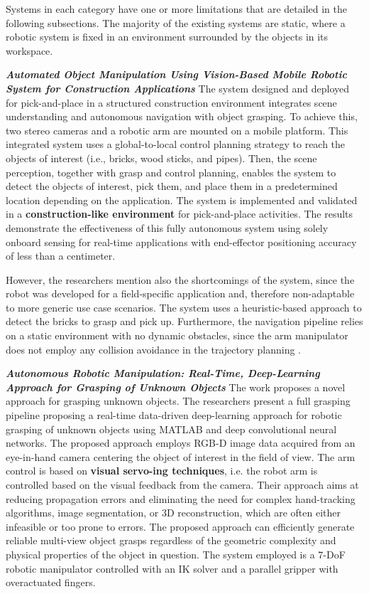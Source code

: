 Systems in each category have one or more limitations that are detailed in the following
subsections. The majority of the existing systems are static, where a robotic system
is fixed in an environment surrounded by the objects in its workspace.

\textbf{\textit{Automated Object Manipulation Using Vision-Based Mobile
		Robotic System for Construction Applications}} \quad
The system designed and deployed for pick-and-place in a structured construction environment
\cite{asadi2019construction} integrates scene understanding and autonomous navigation
with object grasping. To achieve this, two stereo cameras and a robotic arm are mounted
on a mobile platform. This integrated system uses a global-to-local control planning strategy
to reach the objects of interest (i.e., bricks, wood sticks, and pipes).
Then, the scene perception, together with grasp and control planning, enables the system
to detect the objects of interest, pick them, and place them in a predetermined location depending
on the application.
The system is implemented and validated in a \textbf{construction-like environment} for pick-and-place
activities. The results demonstrate the effectiveness of this fully autonomous system
using solely onboard sensing for real-time applications with end-effector positioning
accuracy of less than a centimeter.

However, the researchers mention also the shortcomings of the system, since the robot
was developed for a field-specific application and, therefore non-adaptable to more generic
use case scenarios. The system uses a heuristic-based approach to detect the
bricks to grasp and pick up. Furthermore, the navigation pipeline relies on a static environment
with no dynamic obstacles, since the arm manipulator does not employ any collision avoidance
in the trajectory planning \cite{asadi2019construction}.


\textbf{\textit{Autonomous Robotic Manipulation: Real-Time, Deep-Learning
		Approach for Grasping of Unknown Objects}} \quad
The work \cite{sayour2022unknowngrasping} proposes a novel approach for grasping unknown objects.
The researchers present a full grasping pipeline proposing a real-time data-driven
deep-learning approach for robotic grasping of unknown objects using MATLAB and
deep convolutional neural networks. The proposed approach employs RGB-D image data
acquired from an eye-in-hand camera centering the object of interest in the field of
view. The arm control is based on \textbf{visual servo-ing techniques}, i.e. the robot arm
is controlled based on the visual feedback from the camera. Their approach aims at reducing propagation errors
and eliminating the need for complex hand-tracking algorithms, image segmentation,
or 3D reconstruction, which are often either infeasible or too prone to errors.
The proposed approach can efficiently generate reliable multi-view object grasps
regardless of the geometric complexity and physical properties of the object in question.
The system employed is a 7-DoF robotic manipulator controlled with an IK solver
and a parallel gripper with overactuated fingers.

